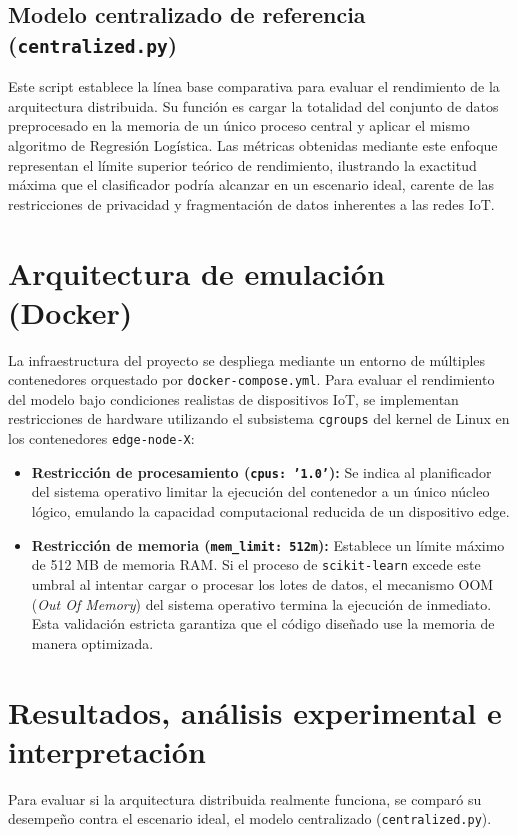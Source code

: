 \documentclass[12pt,a4paper]{article}
\begin{document}
\subsection{Modelo centralizado de referencia (\texttt{centralized.py})}
Este script establece la línea base comparativa para evaluar el rendimiento de la arquitectura distribuida. Su función es cargar la totalidad del conjunto de datos preprocesado en la memoria de un único proceso central y aplicar el mismo algoritmo de Regresión Logística. Las métricas obtenidas mediante este enfoque representan el límite superior teórico de rendimiento, ilustrando la exactitud máxima que el clasificador podría alcanzar en un escenario ideal, carente de las restricciones de privacidad y fragmentación de datos inherentes a las redes IoT.

\section{Arquitectura de emulación (Docker)}
La infraestructura del proyecto se despliega mediante un entorno de múltiples contenedores orquestado por \texttt{docker-compose.yml}. Para evaluar el rendimiento del modelo bajo condiciones realistas de dispositivos IoT, se implementan restricciones de hardware utilizando el subsistema \texttt{cgroups} del kernel de Linux en los contenedores \texttt{edge-node-X}:

\begin{itemize}
    \item \textbf{Restricción de procesamiento (\texttt{cpus: '1.0'}):} Se indica al planificador del sistema operativo limitar la ejecución del contenedor a un único núcleo lógico, emulando la capacidad computacional reducida de un dispositivo edge.
    
    \item \textbf{Restricción de memoria (\texttt{mem\_limit: 512m}):} Establece un límite máximo de 512 MB de memoria RAM. Si el proceso de \texttt{scikit-learn} excede este umbral al intentar cargar o procesar los lotes de datos, el mecanismo OOM (\textit{Out Of Memory}) del sistema operativo termina la ejecución de inmediato. Esta validación estricta garantiza que el código diseñado use la memoria de manera optimizada.
\end{itemize}

\section{Resultados, análisis experimental e interpretación}
Para evaluar si la arquitectura distribuida realmente funciona, se comparó su desempeño contra el escenario ideal, el modelo centralizado (\texttt{centralized.py}).
\end{document}
